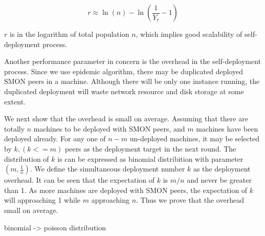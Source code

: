 \begin{equation*}
r \approx \ln(n) - \ln(\frac{1}{Y_r} - 1)
\end{equation*}

$r$ is in the logarithm of total population $n$, which
implies good scalability of self-deployment process.


Another performance parameter in concern is the overhead in
the self-deployment process. Since we use epidemic
algorithm, there may be duplicated deployed SMON peers in a
machine. Although there will be only one instance running,
the duplicated deployment will waste network resource and
disk storage at some extent.

We next show that the overhead is small on average. Assuming
that there are totally $n$ machines to be deployed with SMON
peers, and $m$ machines have been deployed already. For any
one of $n-m$ un-deployed machines, it may be selected by $k,
(k <= m)$ peers as the deployment target in the next round.
The distribution of $k$ is can be expressed as binomial
distribition with parameter $(m, \frac{1}{n})$. We define
the simultaneous deployment number $k$ as the deployment
overhead. It can be seen that the expectation of $k$ is
$m/n$ and never be greater than 1. As more machines are
deployed with SMON peers, the expectation of $k$ will
approaching 1 while $m$ approaching $n$. Thus we prove that
the overhead small on average.


binomial -> poisson distribution



